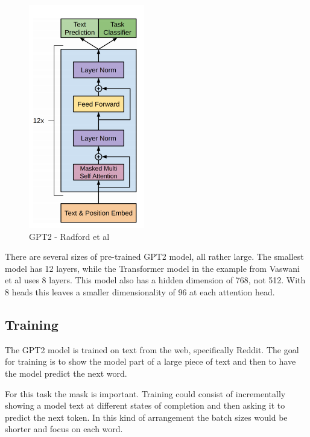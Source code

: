\begin{figure}[H]
	\begin{center}
		
		
		\includegraphics[scale=3.0]{diagram-mat05}
	\end{center}
	\caption[Generative Pre-Training 2 ]{GPT2 - Radford et al \cite{radford2018improving}}
	

\end{figure}

There are several sizes of pre-trained GPT2 model, all rather large. The smallest model has 12 layers, while the Transformer model in the example from Vaswani et al \cite{Vaswani2017AttentionIA} uses 8 layers. This model also has a hidden dimension of 768, not 512. With 8 heads this leaves a smaller dimensionality of 96 at each attention head. 



\subsection{Training}

The GPT2 model is trained on text from the web, specifically Reddit. The goal for training is to show the model part of a large piece of text and then to have the model predict the next word. 

For this task the mask is important. Training could consist of incrementally showing a model text at different states of completion and then asking it to predict the next token. In this kind of arrangement the batch sizes would be shorter and focus on each word. 


